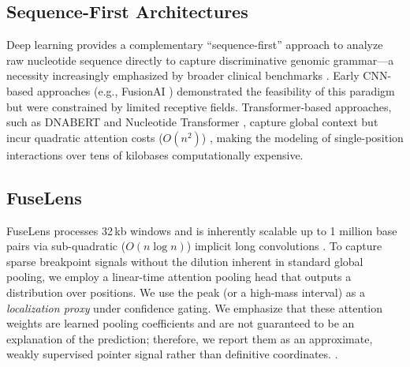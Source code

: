 \documentclass{bioinfo}
\begin{document}
\subsection{Sequence-First Architectures}
Deep learning provides a complementary ``sequence-first'' approach to analyze raw nucleotide sequence directly to capture discriminative genomic grammar—a necessity increasingly emphasized by broader clinical benchmarks \cite{krupicka2025benchmarking}. Early CNN-based approaches (e.g., FusionAI \cite{fusionai}) demonstrated the feasibility of this paradigm but were constrained by limited receptive fields. Transformer-based approaches, such as DNABERT \cite{dnabert} and Nucleotide Transformer \cite{nucleotide}, capture global context but incur quadratic attention costs ($O(n^2)$) \cite{vaswani}, making the modeling of single-position interactions over tens of kilobases computationally expensive.

\subsection{FuseLens}
FuseLens processes 32\,kb windows and is inherently scalable up to 1 million base pairs via sub-quadratic ($O(n\log n)$) implicit long convolutions \cite{hyena_hierarchy}. To capture sparse breakpoint signals without the dilution inherent in standard global pooling, we employ a linear-time attention pooling head that outputs a distribution over positions.
We use the peak (or a high-mass interval) as a \emph{localization proxy} under confidence gating.
We emphasize that these attention weights are learned pooling coefficients and are not guaranteed to be an explanation of the prediction; therefore, we report them as an approximate, weakly supervised pointer signal rather than definitive coordinates. \cite{attention_not_explanation, attention_not_not}.
\end{document}
